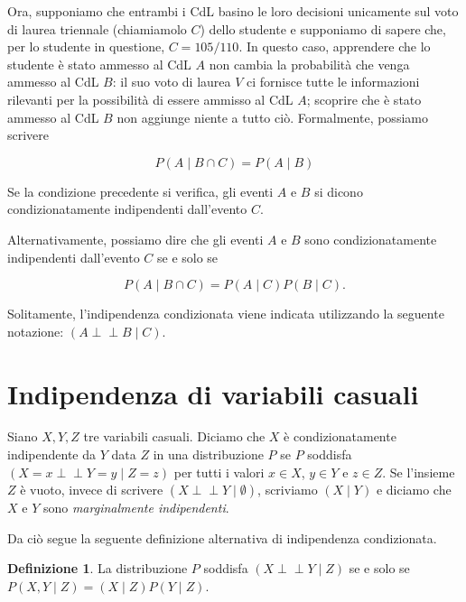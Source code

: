 \documentclass[
  11pt,
]{krantz}
\newcommand{\indep}{\perp \!\!\! \perp}
\theoremstyle{definition}
\newtheorem{definition}{Definizione}[chapter]
\theoremstyle{definition}
\theoremstyle{definition}
\theoremstyle{definition}
\theoremstyle{remark}
\begin{document}
Ora, supponiamo che entrambi i CdL basino le loro decisioni unicamente sul voto di laurea triennale (chiamiamolo \(C\)) dello studente e supponiamo di sapere che, per lo studente in questione, \(C = 105/110\). In questo caso, apprendere che lo studente è stato ammesso al CdL \(A\) non cambia la probabilità che venga ammesso al CdL \(B\): il suo voto di laurea \(V\) ci fornisce tutte le informazioni rilevanti per la possibilità di essere ammisso al CdL \(A\); scoprire che è stato ammesso al CdL \(B\) non aggiunge niente a tutto ciò. Formalmente, possiamo scrivere

\begin{equation}
P(A \mid B \cap C) = P(A \mid B)
\end{equation}

Se la condizione precedente si verifica, gli eventi \(A\) e \(B\) si dicono condizionatamente indipendenti dall'evento \(C\).

Alternativamente, possiamo dire che gli eventi \(A\) e \(B\) sono condizionatamente indipendenti dall'evento \(C\) se e solo se

\begin{equation}
P(A \mid B \cap C) = P(A \mid C) P(B \mid C).
\end{equation}

Solitamente, l'indipendenza condizionata viene indicata utilizzando la seguente notazione: \((A \indep B \mid C)\).

\hypertarget{indipendenza-di-variabili-casuali}{%
\section{Indipendenza di variabili casuali}\label{indipendenza-di-variabili-casuali}}

Siano \(X, Y, Z\) tre variabili casuali. Diciamo che \(X\) è condizionatamente indipendente da \(Y\) data \(Z\) in una distribuzione \(P\) se \(P\) soddisfa \((X=x \indep Y=y \mid Z=z)\) per tutti i valori \(x \in X\), \(y \in Y\) e \(z \in Z\). Se l'insieme \(Z\) è vuoto, invece di scrivere \((X \indep Y \mid \emptyset)\), scriviamo \((X \mid Y)\) e diciamo che \(X\) e \(Y\) sono \emph{marginalmente indipendenti}.

Da ciò segue la seguente definizione alternativa di indipendenza condizionata.

\begin{definition}
La distribuzione \(P\) soddisfa \((X \indep Y \mid Z)\) se e solo se \(P(X,Y \mid Z) = (X \mid Z)P(Y \mid Z)\).
\end{definition}
\end{document}
